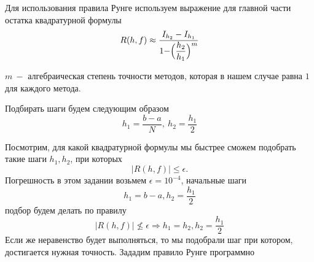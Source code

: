 \documentclass[11pt]{article}
\begin{document}
    Для использования правила Рунге используем выражение для главной части
остатка квадратурной формулы
\[R(h, f) \approx \dfrac{I_{h_2} - I_{h_1}}{1 - \Bigr( \dfrac{h_2}{h_1} \Bigl)^m}\]

\(m \ -\) алгебраическая степень точности методов, которая в нашем
случае равна \(1\) для каждого метода.

Подбирать шаги будем следующим образом
\[h_1 = \dfrac{b-a}{N}, \ h_2 = \dfrac{h_1}{2}\]

Посмотрим, для какой квадратурной формулы мы быстрее сможем подобрать
такие шаги \(h_1, h_2\), при которых \[|R(h,f)| \leq \epsilon.\]
Погрешность в этом задании возьмем \(\epsilon = 10^{-4}\), начальные
шаги \[h_1=b-a, h_2 = \frac{h_1}{2}\] подбор будем делать по правилу
\[|R(h,f)| \nleq \epsilon \Rightarrow h_1 = h_2, h_2 = \frac{h_1}{2}\]
Если же неравенство будет выполняться, то мы подобрали шаг при котором,
достигается нужная точность. Зададим правило Рунге программно
\end{document}
